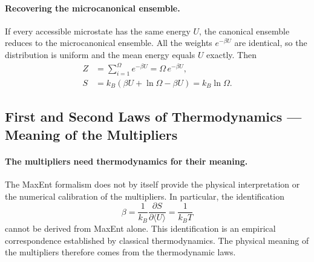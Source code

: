 \paragraph{Recovering the microcanonical ensemble.}
If every accessible microstate has the same energy $U$, the canonical
ensemble reduces to the microcanonical ensemble. All the weights
$e^{-\beta U}$ are identical, so the distribution is uniform and the mean
energy equals $U$ exactly. Then
\begin{align*}
    Z &= \sum_{i=1}^{\Omega} e^{-\beta U} = \Omega\, e^{-\beta U}, \\
    S &= k_B\left(\beta U+\ln\Omega-\beta U\right) = k_B\ln\Omega.
\end{align*}

\subsection{First and Second Laws of Thermodynamics --- Meaning of the Multipliers}
\label{sec:multipliers}

\paragraph{The multipliers need thermodynamics for their meaning.}
The MaxEnt formalism does not by itself provide the physical interpretation
or the numerical calibration of the multipliers. In particular, the
identification
\begin{equation}
    \boxed{\beta=\frac{1}{k_B}\frac{\partial S}{\partial \langle U\rangle}=\frac{1}{k_BT}}
\end{equation}
cannot be derived from MaxEnt alone. This identification is an empirical
correspondence established by classical thermodynamics. The physical meaning
of the multipliers therefore comes from the thermodynamic laws.

